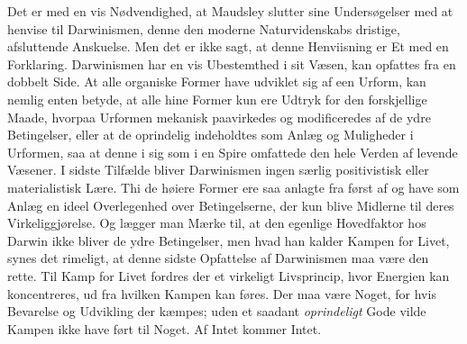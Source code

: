 \documentclass[12pt,a4paper,openany]{book}
\begin{document}
Det er med en vis Nødvendighed, at Maudsley slutter
sine Undersøgelser med at henvise til Darwinismen, denne
den moderne Naturvidenskabs dristige, afsluttende Anskuelse.
Men det er ikke sagt, at denne Henviisning er Et med en
Forklaring. Darwinismen har en vis Ubestemthed i sit
Væsen, kan opfattes fra en dobbelt Side. At alle organiske
Former have udviklet sig af een Urform, kan nemlig enten
betyde, at alle hine Former kun ere Udtryk for den forskjellige
Maade, hvorpaa Urformen mekanisk paavirkedes og
modificeredes af de ydre Betingelser, eller at de oprindelig
indeholdtes som Anlæg og Muligheder i Urformen, saa at
denne i sig som i en Spire omfattede den hele Verden af
levende Væsener. I sidste Tilfælde bliver Darwinismen ingen
særlig positivistisk eller materialistisk Lære. Thi de høiere
Former ere saa anlagte fra først af og have som Anlæg en
ideel Overlegenhed over Betingelserne, der kun blive Midlerne
til deres Virkeliggjørelse. Og lægger man Mærke til, at den
egenlige Hovedfaktor hos Darwin ikke bliver de ydre Betingelser,
men hvad han kalder Kampen for Livet, synes det
rimeligt, at denne sidste Opfattelse af Darwinismen maa
være den rette. Til Kamp for Livet fordres der et virkeligt
Livsprincip, hvor Energien kan koncentreres, ud fra hvilken
Kampen kan føres. Der maa være Noget, for hvis Bevarelse
og Udvikling der kæmpes; uden et saadant \emph{oprindeligt} Gode
vilde Kampen ikke have ført til Noget. Af Intet kommer Intet.
\end{document}
